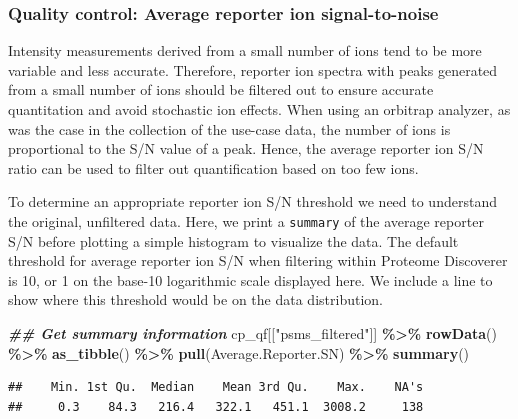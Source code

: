 \documentclass[9pt,a4paper,]{extarticle}
\newenvironment{Shaded}{\begin{snugshade}}{\end{snugshade}}
\newcommand{\DocumentationTok}[1]{\textcolor[rgb]{0.56,0.35,0.01}{\textbf{\textit{#1}}}}
\newcommand{\FunctionTok}[1]{\textcolor[rgb]{0.13,0.29,0.53}{\textbf{#1}}}
\newcommand{\NormalTok}[1]{#1}
\newcommand{\SpecialCharTok}[1]{\textcolor[rgb]{0.81,0.36,0.00}{\textbf{#1}}}
\newcommand{\StringTok}[1]{\textcolor[rgb]{0.31,0.60,0.02}{#1}}
\begin{document}
\subsubsection{Quality control: Average reporter ion signal-to-noise}\label{quality-control-average-reporter-ion-signal-to-noise}

Intensity measurements derived from a small number of ions tend to be more
variable and less accurate. Therefore, reporter ion spectra with peaks generated
from a small number of ions should be filtered out to ensure accurate
quantitation and avoid stochastic ion effects. When using an orbitrap analyzer,
as was the case in the collection of the use-case data, the number of ions is
proportional to the S/N value of a peak. Hence, the average reporter ion S/N
ratio can be used to filter out quantification based on too few ions.

To determine an appropriate reporter ion S/N threshold we need to understand the
original, unfiltered data. Here, we print a \texttt{summary} of the average reporter
S/N before plotting a simple histogram to visualize the data. The default
threshold for average reporter ion S/N when filtering within Proteome Discoverer
is 10, or 1 on the base-10 logarithmic scale displayed here. We include a line
to show where this threshold would be on the data distribution.

\begin{Shaded}
\begin{Highlighting}[]
\DocumentationTok{\#\# Get summary information}
\NormalTok{cp\_qf[[}\StringTok{"psms\_filtered"}\NormalTok{]] }\SpecialCharTok{\%\textgreater{}\%} 
  \FunctionTok{rowData}\NormalTok{() }\SpecialCharTok{\%\textgreater{}\%} 
  \FunctionTok{as\_tibble}\NormalTok{() }\SpecialCharTok{\%\textgreater{}\%} 
  \FunctionTok{pull}\NormalTok{(Average.Reporter.SN) }\SpecialCharTok{\%\textgreater{}\%} 
  \FunctionTok{summary}\NormalTok{()}
\end{Highlighting}
\end{Shaded}

\begin{verbatim}
##    Min. 1st Qu.  Median    Mean 3rd Qu.    Max.    NA's 
##     0.3    84.3   216.4   322.1   451.1  3008.2     138
\end{verbatim}
\end{document}
